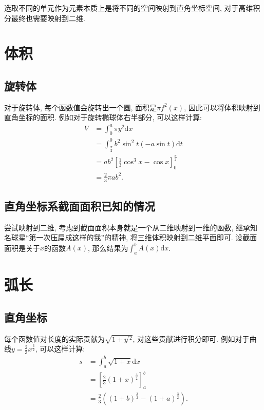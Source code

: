 \documentclass[UTF8,a4paper,11pt]{ctexart}
\begin{document}
      选取不同的单元作为元素本质上是将不同的空间映射到直角坐标空间,
      对于高维积分最终也需要映射到二维.

  \section{体积}
    \subsection{旋转体}
      对于旋转体, 每个函数值会旋转出一个圆,
      面积是$\pi f^2\left(x\right)$,
      因此可以将体积映射到直角坐标的面积.
      例如对于旋转椭球体右半部分,
      可以这样计算:
      \[
      \begin{aligned}
        V&=\int_{0}^{a}\pi y^{2}\mathrm{d}x
        \\&=\int_{\frac{\pi}{2}}^{0}b^{2}\sin ^{2}t \left(-a \sin t \right)\mathrm{d}t
        \\&=ab^{2}\left[\frac{1}{3}\cos ^{3}x -\cos x\right]_{0}^{\frac{\pi}{2}}
        \\&=\frac{2}{3}\pi ab^{2}
      .\end{aligned}
      \]
    \subsection{直角坐标系截面面积已知的情况}
      尝试映射到二维,
      考虑到截面面积本身就是一个从二维映射到一维的函数,
      继承知名球星``第一次压扁成这样的我''的精神,
      将三维体积映射到二维平面即可.
      设截面面积是关于$x$的函数$A\left(x\right)$,
      那么结果为$\int_{a}^{b}A\left(x\right)\mathrm{d}x$.

  \section{弧长}
    \subsection{直角坐标}
      每个函数值对长度的实际贡献为$\sqrt{1+y^{\prime 2}}$,
      对这些贡献进行积分即可.
      例如对于曲线$y=\frac{2}{3}x^{\frac{3}{2}}$,
      可以这样计算:
      \[
      \begin{aligned}
        s&=\int_{a}^{b}\sqrt{1+x}\mathrm{d}x
        \\&=\left[\frac{2}{3}\left(1+x\right)^{\frac{3}{2}}\right]_{a}^{b}
        \\&=\frac{2}{3}\left(\left(1+b\right)^{\frac{3}{2}}-\left(1+a\right)^{\frac{3}{2}}\right)
      .\end{aligned}
      \]
\end{document}
